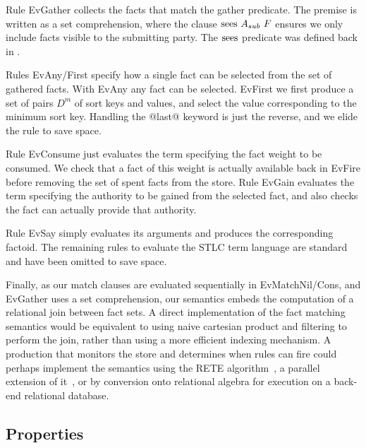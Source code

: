 Rule EvGather collects the facts that match the gather predicate. The premise is written as a set comprehension, where the clause $\textrm{sees}~ A_{sub}~ F$ ensures we only include facts visible to the submitting party. The $\textrm{sees}$ predicate was defined back in \REF.

Rules EvAny/First specify how a single fact can be selected from the set of gathered facts. With EvAny any fact can be selected. EvFirst we first produce a set of pairs $D^m$ of sort keys and values, and select the value corresponding to the minimum sort key. Handling the @last@ keyword is just the reverse, and we elide the rule to save space.

Rule EvConsume just evaluates the term specifying the fact weight to be consumed. We check that a fact of this weight is actually available back in EvFire before removing the set of spent facts from the store. Rule EvGain evaluates the term specifying the authority to be gained from the selected fact, and also checks the fact can actually provide that authority.

Rule EvSay simply evaluates its arguments and produces the corresponding factoid. The remaining rules to evaluate the STLC term language are standard and have been omitted to save space.

Finally, as our match clauses are evaluated sequentially in EvMatchNil/Cons, and EvGather uses a set comprehension, our semantics embeds the computation of a relational join between fact sets. A direct implementation of the fact matching semantics would be equivalent to using naive cartesian product and filtering to perform the join, rather than using a more efficient indexing mechanism. A production that monitors the store and determines when rules can fire could perhaps implement the semantics using the RETE algorithm~\cite{Forgy1981:RETE, Doorenbos1995:ProductionMatching}, a parallel extension of it~\cite{Aref1998:LanaMatch}, or by conversion onto relational algebra for execution on a back-end relational database.




\eject{}
\subsection{Properties}


